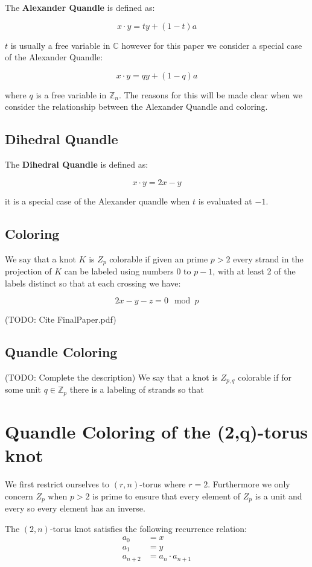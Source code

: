 \documentclass[12pt]{article}
\begin{document}
The \textbf{Alexander Quandle} is defined as:

$$ x \cdot y = ty + (1 - t)a $$

$t$ is usually a free variable in $\mathbb{C}$ however for this paper we consider a special case of the Alexander Quandle:

$$ x \cdot y = qy + (1 - q)a $$

where $q$ is a free variable in $\mathbb{Z}_n$. The reasons for this will be made clear when we consider the relationship between the Alexander Quandle and coloring.

\subsection{Dihedral Quandle}
The \textbf{Dihedral Quandle} is defined as:

$$x\cdot y = 2x - y$$

it is a special case of the Alexander quandle when $t$ is evaluated at $-1$.

\subsection{Coloring}

We say that a knot $K$ is $Z_p$ colorable if given an prime $p > 2$ every strand in the projection of $K$ can be labeled using numbers $0$ to $p-1$, with at least 2 of the labels distinct so that at each crossing we have:

$$ 2x - y - z = 0 \mod p $$

(TODO: Cite FinalPaper.pdf)

\subsection{Quandle Coloring}

(TODO: Complete the description)
We say that a knot is $Z_{p,q}$ colorable if for some unit $q \in \mathbb{Z}_p$ there is a labeling of strands so that

\section{Quandle Coloring of the (2,q)-torus knot}\label{2ntorus}
We first restrict ourselves to $(r,n)$-torus where $r = 2$. Furthermore we only concern $Z_p$ when $p > 2$ is prime to ensure that every element of $Z_p$ is a unit and every so every element has an inverse.

The $(2,n)$-torus knot satisfies the following recurrence relation:
\begin{align*}
	a_0 &= x \\
	a_1 &= y \\
	a_{n+2} &= a_{n} \cdot a_{n+1} \\
\end{align*}
\end{document}

